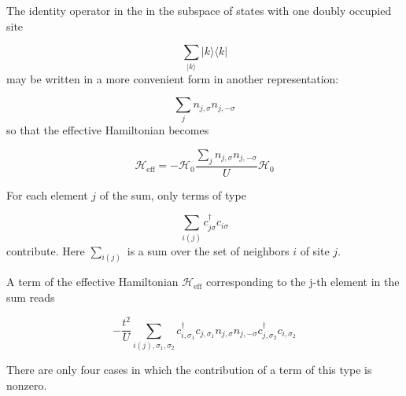 \documentclass[10pt, twocolumn, twoside]{article}
\begin{document}
The identity operator in the in the subspace of states with one doubly occupied site

\begin{equation*}
\sum_{ | k \rangle} | k \rangle \langle k |
\end{equation*}
may be written in a more convenient form in another representation:

\begin{equation*}
\sum_j n_{j,\sigma} n_{j, -\sigma}
\end{equation*}
so that the effective Hamiltonian becomes

\begin{equation}
\mathcal{H}_{\text{eff}} = - \mathcal{H}_0 \frac{\sum_j n_{j,\sigma} n_{j, -\sigma}}{U} \mathcal{H}_0
\end{equation}

For each element $j$ of the sum, only terms of type 

\begin{equation*}
\sum_{i(j)} c_{j\sigma}^\dagger c_{i\sigma} 
\end{equation*}
contribute. Here $\sum_{i(j)}$ is a sum over the set of neighbors $i$ of site $j$.

A term of the effective Hamiltonian $\mathcal{H}_{\text{eff}}$ corresponding to the j-th element in the sum reads

\begin{equation*}
-\frac{t^2}{U} \sum_{i(j), \sigma_1, \sigma_2 } c_{i,\sigma_1}^\dagger c_{j,\sigma_1} n_{j,\sigma} n_{j, -\sigma} c_{j, \sigma_2}^\dagger c_{i, \sigma_2}
\end{equation*}

There are only four cases in which the contribution of a term of this type is nonzero.
\end{document}
